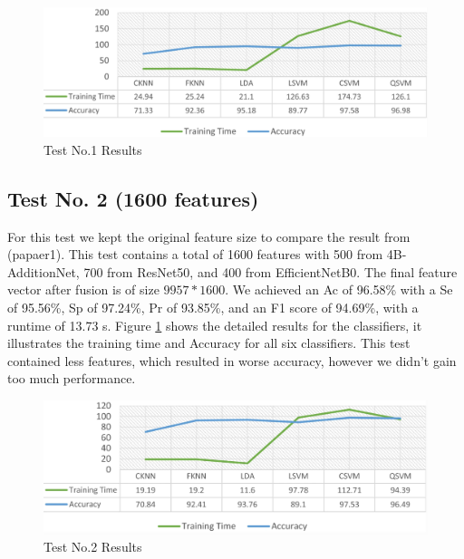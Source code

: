 \documentclass[conference]{IEEEtran}
\begin{document}
\begin{figure}[htbp]
    \begin{center}
    \includegraphics[scale=0.25]{test1.png}
    \end{center}
    \caption{Test No.1 Results}
    \label{test1}
\end{figure}

\subsection{Test No. 2 (1600 features)}

For this test we kept the original feature size to compare the result from (papaer1).
This test contains a total of 1600 features with 500 from 4B-AdditionNet, 700 from ResNet50, and 400 from EfficientNetB0. 
The final feature vector after fusion is of size $9957*1600$.
We achieved an Ac of 96.58\% with a Se of 95.56\%, Sp of 97.24\%, Pr of 93.85\%, and an F1 score of 94.69\%, with a runtime of 13.73 s. 
Figure \ref{test1} shows the detailed results for the classifiers, it illustrates the training time and Accuracy for all six classifiers.
This test contained less features, which resulted in worse accuracy, however we didn't gain too much performance.

\begin{figure}[htbp]
    \begin{center}
    \includegraphics[scale=0.25]{test2.png}
    \end{center}
    \caption{Test No.2 Results}
    \label{test2}
\end{figure}
\end{document}
